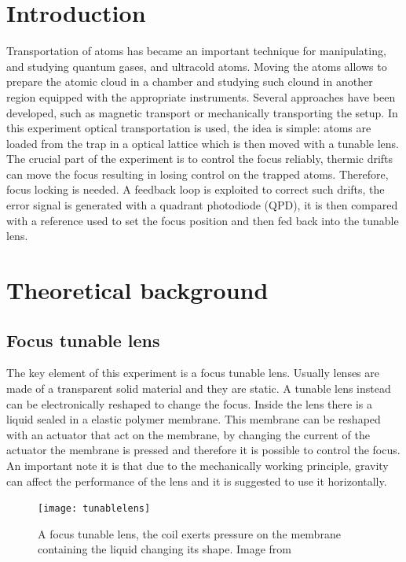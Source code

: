 \documentclass[a4paper,10pt]{article}
\begin{document}
\section{Introduction}
Transportation of atoms has became an important technique for manipulating, and studying quantum gases, and ultracold atoms. Moving the atoms allows to prepare the atomic cloud in a chamber and studying such clound in another region equipped with the appropriate instruments. Several approaches have been developed, such as magnetic transport or mechanically transporting the setup. In this experiment optical transportation is used, the idea is simple: atoms are loaded from the trap in a optical lattice which is then moved with a tunable lens. The crucial part of the experiment is to control the focus reliably, thermic drifts can move the focus resulting in losing control on the trapped atoms. Therefore, focus locking is needed. A feedback loop is exploited to correct such drifts, the error signal is generated with a quadrant photodiode (QPD), it is then compared with a reference used to set the focus position and then fed back into the tunable lens.

\section{Theoretical background}
\subsection{Focus tunable lens}
The key element of this experiment is a focus tunable lens. Usually lenses are made of a transparent solid material and they are static. A tunable lens instead can be electronically reshaped to change the focus. Inside the lens there is a liquid sealed in a elastic polymer membrane. This membrane can be reshaped with an actuator that act on the membrane, by changing the current of the actuator the membrane is pressed and therefore it is possible to control the focus. An important note it is that due to the mechanically working principle, gravity can affect the performance of the lens and it is suggested to use it horizontally.
\begin{figure}[H]
\centering
\texttt{[image: tunablelens]}
\caption{A focus tunable lens, the coil exerts pressure on the membrane containing the liquid changing its shape. Image from \cite{lens_datasheet}}
\end{figure}
\end{document}
